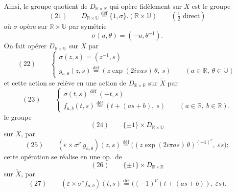 \documentclass[11pt,a4paper]{article}
\begin{document}
Ainsi, le groupe quotient de $D_{\mathbb{R}\times\mathbb{R}}$ qui opère fidèlement sur $X$ est le groupe
\[
(21)\qquad D_{\mathbb{R}\times\mathbb{U}} \overset{\text{déf}}{=} \{1,\sigma\}.(\mathbb{R}\times\mathbb{U})\qquad(\tfrac12\text{ direct})
\]
où $\sigma$ opère  sur $\mathbb{R}\times\mathbb{U}$ par symétrie
\[
\sigma(u,\theta)=(-u,\theta^{-1}).
\]
On fait opérer $D_{\mathbb{R}\times\mathbb{U}}$ sur $X$ par
\[
(22)\qquad
\begin{cases}
\sigma(z,s)=(z^{-1},s)\\
g_{a,\theta}(z,s)\overset{\text{déf}}{=}(z\exp(2i\pi as)\,\theta,\ s)\qquad (a\in\mathbb{R},\ \theta\in\mathbb{U})
\end{cases}
\]
et cette action se relève en une action de $D_{\mathbb{R}\times\mathbb{R}}$ sur $\widetilde{X}$ par
\[
(23)\qquad
\begin{cases}
\sigma(t,s)\overset{\text{déf}}{=}(-t,s)\\
f_{a,b}(t,s)\overset{\text{déf}}{=}(t+(as+b),\ s)\qquad (a\in\mathbb{R},\ b\in\mathbb{R}).
\end{cases}
\]
  le groupe
\[
(24)\qquad \{\pm1\}\times D_{\mathbb{R}\times\mathbb{U}}
\]
sur $X$, par
\[
(25)\qquad (\varepsilon\times\sigma^\nu.g_{a,\theta})(z,s)\overset{\text{déf}}{=}\bigl((z\exp(2i\pi as)\,\theta)^{(-1)^\nu},\ \varepsilon s\bigr) ;
\]
cette opération se réalise en une op.\ de
\[
(26)\qquad \{\pm1\}\times D_{\mathbb{R}\times\mathbb{R}}
\]
sur $\widetilde{X}$, par
\[
(27)\qquad (\varepsilon\times\sigma^\nu f_{a,b})(t,s)\overset{\text{déf}}{=}\bigl((-1)^\nu(t+(as+b)),\ \varepsilon s\bigr).
\]
\end{document}
